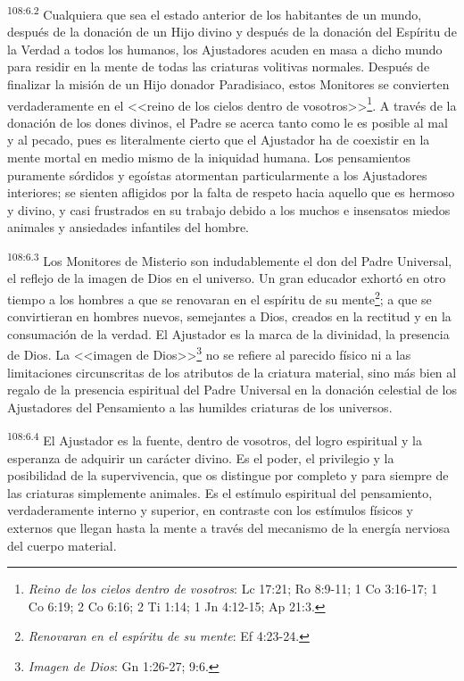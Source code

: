 \par
\textsuperscript{108:6.2} Cualquiera que sea el estado anterior de los habitantes de un mundo, después de la donación de un Hijo divino y después de la donación del Espíritu de la Verdad a todos los humanos, los Ajustadores acuden en masa a dicho mundo para residir en la mente de todas las criaturas volitivas normales. Después de finalizar la misión de un Hijo donador Paradisiaco, estos Monitores se convierten verdaderamente en el <<reino de los cielos dentro de vosotros>>\footnote{\textit{Reino de los cielos dentro de vosotros}: Lc 17:21; Ro 8:9-11; 1 Co 3:16-17; 1 Co 6:19; 2 Co 6:16; 2 Ti 1:14; 1 Jn 4:12-15; Ap 21:3.}. A través de la donación de los dones divinos, el Padre se acerca tanto como le es posible al mal y al pecado, pues es literalmente cierto que el Ajustador ha de coexistir en la mente mortal en medio mismo de la iniquidad humana. Los pensamientos puramente sórdidos y egoístas atormentan particularmente a los Ajustadores interiores; se sienten afligidos por la falta de respeto hacia aquello que es hermoso y divino, y casi frustrados en su trabajo debido a los muchos e insensatos miedos animales y ansiedades infantiles del hombre.

\par
\textsuperscript{108:6.3} Los Monitores de Misterio son indudablemente el don del Padre Universal, el reflejo de la imagen de Dios en el universo. Un gran educador exhortó en otro tiempo a los hombres a que se renovaran en el espíritu de su mente\footnote{\textit{Renovaran en el espíritu de su mente}: Ef 4:23-24.}; a que se convirtieran en hombres nuevos, semejantes a Dios, creados en la rectitud y en la consumación de la verdad. El Ajustador es la marca de la divinidad, la presencia de Dios. La <<imagen de Dios>>\footnote{\textit{Imagen de Dios}: Gn 1:26-27; 9:6.} no se refiere al parecido físico ni a las limitaciones circunscritas de los atributos de la criatura material, sino más bien al regalo de la presencia espiritual del Padre Universal en la donación celestial de los Ajustadores del Pensamiento a las humildes criaturas de los universos.

\par
\textsuperscript{108:6.4} El Ajustador es la fuente, dentro de vosotros, del logro espiritual y la esperanza de adquirir un carácter divino. Es el poder, el privilegio y la posibilidad de la supervivencia, que os distingue por completo y para siempre de las criaturas simplemente animales. Es el estímulo espiritual del pensamiento, verdaderamente interno y superior, en contraste con los estímulos físicos y externos que llegan hasta la mente a través del mecanismo de la energía nerviosa del cuerpo material.

